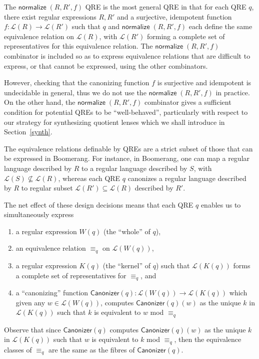 \documentclass{svproc}
\newcommand{\kw}[1]{\ensuremath{\mathsf{#1}}}
\newcommand{\normalize}[3]{\ensuremath{\kw{normalize} \; (#1, #2, #3)}}
\newcommand{\canonizer}{\ensuremath{\kw{Canonizer}}}
\newcommand{\eqrel}[1]{\ensuremath{\equiv_{#1}}}
\begin{document}
The $\normalize{R}{R'}{f}$ QRE is the most general QRE in that for each QRE
$q$, there exist regular expressions $R, R'$ and a surjective, idempotent
function $f:\mathcal{L}(R) \longrightarrow \mathcal{L}(R')$ such that $q$ and
$\normalize{R}{R'}{f}$ each define the same equivalence relation on
$\mathcal{L}(R)$, with $\mathcal{L}(R')$ forming a complete set of
representatives for this equivalence relation. The $\normalize{R}{R'}{f}$
combinator is included so as to express equivalence relations that are
difficult to express, or that cannot be expressed, using the other
combinators.

However, checking that the canonizing function $f$ is
surjective and idempotent is undecidable in general, thus we do not use the
$\normalize{R}{R'}{f}$ in practice. On the other hand, the
$\normalize{R}{R'}{f}$ combinator gives a sufficient condition for potential
QREs to be ``well-behaved'', particularly with respect to our strategy for
synthesizing quotient lenses which we shall introduce in Section~\ref{synth}.

The equivalence relations definable by QREs are a strict subset of those that
can be expressed in Boomerang. For instance, in Boomerang, one can map a
regular language described by $R$ to a regular language described by $S$, with
$\mathcal{L}(S) \not \subseteq \mathcal{L}(R)$, whereas each QRE $q$ canonizes
a regular language described by $R$ to regular subset $\mathcal{L}(R')
\subseteq \mathcal{L}(R)$ described by $R'$.

The net effect of these design decisions means that each QRE $q$ enables us to
simultaneously express
\begin{enumerate}
  \item a regular expression $W(q)$ (the ``whole'' of $q$),
  \item an equivalence relation $\eqrel{q}$ on $\mathcal{L}(W(q))$,
  \item a regular expression $K(q)$ (the ``kernel'' of $q$)
  such that $\mathcal{L}(K(q))$ forms a complete set of representatives for
  $\eqrel{q}$, and
  \item a ``canonizing'' function $\canonizer(q):\mathcal{L}(W(q))
  \longrightarrow \mathcal{L}(K(q))$ which given any $w \in \mathcal{L}(W(q))$,
  computes $\canonizer(q)(w)$ as the unique $k$ in $\mathcal{L}(K(q))$ such that
  $k$ is equivalent to $w$ mod $\eqrel{q}$
  \end{enumerate}
  Observe that since $\canonizer(q)$ computes $\canonizer(q)(w)$ as the unique
  $k$ in $\mathcal{L}(K(q))$ such that $w$ is equivalent to $k$ mod $\eqrel{q}$,
  then the equivalence classes of $\eqrel{q}$ are the same as the fibres of
  $\canonizer(q)$.
\end{document}
